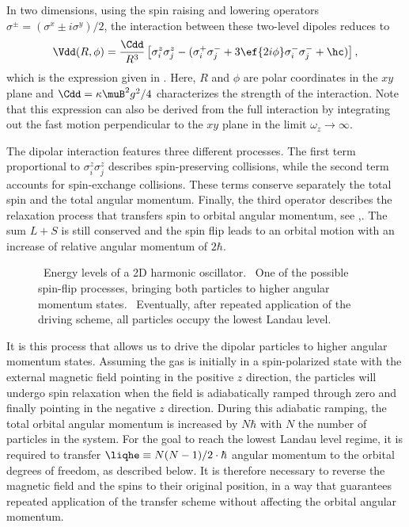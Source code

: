 In two dimensions, using the spin raising and lowering operators $\sigma^{\pm} = (\sigma^x \pm i \sigma^y)/2$, the interaction between these two-level dipoles reduces to
\begin{align}
\Vdd(R,\phi) =  \frac{\Cdd}{R^3} \left[
\sigma^z_i \sigma^z_j - (\sigma^+_i \sigma^-_j +3 \ef{2i\phi} \sigma^-_i \sigma^-_j  +\hc)
\right],
\end{align}
which is the expression given in . Here, $R$ and $\phi$ are polar coordinates in the $xy$ plane and $\Cdd = \kappa \muB^2 g^2 / 4$ characterizes the strength of the interaction.
Note that this expression can also be derived from the full interaction  by integrating out the fast motion perpendicular to the $xy$ plane in the limit $\omega_z\rightarrow\infty$.

The dipolar interaction features three different processes. The first term proportional to $\sigma^z_i\sigma^z_j$ describes spin-preserving collisions, while the second term  accounts for spin-exchange collisions. These terms conserve separately the total spin and the total angular momentum.  Finally, the third operator  describes the relaxation process that transfers spin to orbital angular momentum, see ,. The sum $L+S$ is still conserved and the spin flip leads to an orbital motion with an increase of relative angular momentum of $2\hbar$.

\begin{figure}[t]
    \centering
    \caption{\sfA~Energy levels of a 2D harmonic oscillator. \sfB~One of the possible spin-flip processes, bringing both particles to higher angular momentum states. \sfC~Eventually, after repeated application of the driving scheme, all particles occupy the lowest Landau level.}
\end{figure}

It is this process that allows us to drive the dipolar particles to higher angular momentum states. Assuming the gas is initially in a spin-polarized state with the external magnetic field pointing in the positive $z$ direction, the particles will undergo spin relaxation when the field is adiabatically ramped through zero and finally pointing in the negative $z$ direction. During this adiabatic ramping,
the total orbital angular momentum is increased by $N\hbar$ with $N$ the number of particles in the system.  For the goal to reach the lowest Landau level regime, it is required to transfer  $\liqhe\equiv N(N-1)/2 \cdot \hbar$ angular momentum to the orbital degrees of freedom, as described below. It is therefore necessary to reverse the magnetic field and the spins to their original position, in a way that guarantees repeated application of the transfer scheme without affecting the orbital angular momentum.

